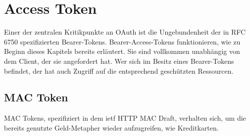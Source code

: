 \section{Access Token}\label{accessTokens}
Einer der zentralen Kritikpunkte an \gls{OAuth} ist die Ungebundenheit der in
RFC 6750 spezifizierten Bearer-Tokens. Bearer-Access-Tokens funktionieren, wie
zu Beginn dieses Kapitels bereits erläutert. Sie sind vollkommen unabhängig von
dem Client, der sie angefordert hat. Wer sich im Besitz eines Bearer-Tokens
befindet, der hat auch Zugriff auf die entsprechend geschützten Ressourcen.

\subsection{MAC Token}\label{ssec: MAC Token}
MAC Tokens, spezifiziert in dem \gls{ietf} HTTP MAC Draft, verhalten sich, um
die bereits genutzte Geld-Metapher wieder aufzugreifen, wie Kreditkarten.
~
